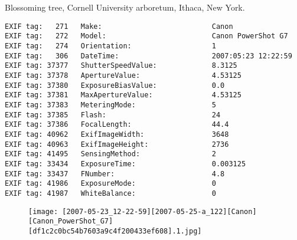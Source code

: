 \section{\protect{}}
\noindent Blossoming tree, Cornell University arboretum, Ithaca, New York.
\noindent
\begin{lstlisting}
EXIF tag:   271   Make:                          Canon
EXIF tag:   272   Model:                         Canon PowerShot G7
EXIF tag:   274   Orientation:                   1
EXIF tag:   306   DateTime:                      2007:05:23 12:22:59
EXIF tag: 37377   ShutterSpeedValue:             8.3125
EXIF tag: 37378   ApertureValue:                 4.53125
EXIF tag: 37380   ExposureBiasValue:             0.0
EXIF tag: 37381   MaxApertureValue:              4.53125
EXIF tag: 37383   MeteringMode:                  5
EXIF tag: 37385   Flash:                         24
EXIF tag: 37386   FocalLength:                   44.4
EXIF tag: 40962   ExifImageWidth:                3648
EXIF tag: 40963   ExifImageHeight:               2736
EXIF tag: 41495   SensingMethod:                 2
EXIF tag: 33434   ExposureTime:                  0.003125
EXIF tag: 33437   FNumber:                       4.8
EXIF tag: 41986   ExposureMode:                  0
EXIF tag: 41987   WhiteBalance:                  0

\end{lstlisting}
\clearpage
\begin{figure}
\raggedleft
\texttt{[image: [2007-05-23\_12-22-59][2007-05-25-a\_122][Canon][Canon\_PowerShot\_G7][df1c2c0bc54b7603a9c4f200433ef608].1.jpg]}
\end{figure}


\clearpage
